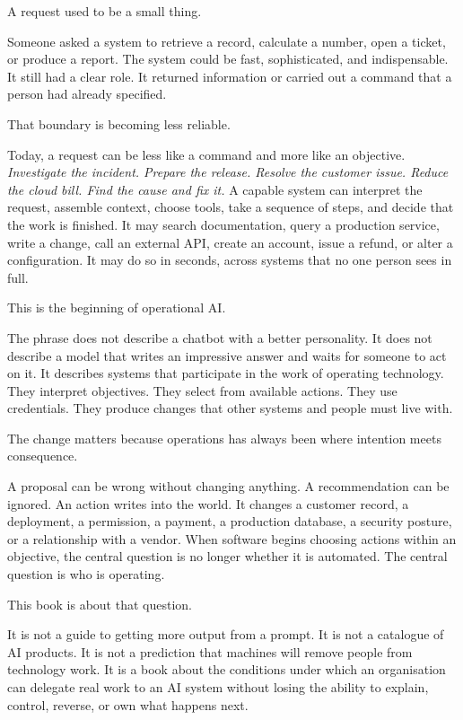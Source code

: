 A request used to be a small thing.

Someone asked a system to retrieve a record, calculate a number, open a
ticket, or produce a report. The system could be fast, sophisticated,
and indispensable. It still had a clear role. It returned information or
carried out a command that a person had already specified.

That boundary is becoming less reliable.

Today, a request can be less like a command and more like an objective.
\emph{Investigate the incident. Prepare the release. Resolve the
customer issue. Reduce the cloud bill. Find the cause and fix it.} A
capable system can interpret the request, assemble context, choose
tools, take a sequence of steps, and decide that the work is finished.
It may search documentation, query a production service, write a change,
call an external API, create an account, issue a refund, or alter a
configuration. It may do so in seconds, across systems that no one
person sees in full.

This is the beginning of operational AI.

The phrase does not describe a chatbot with a better personality. It
does not describe a model that writes an impressive answer and waits for
someone to act on it. It describes systems that participate in the work
of operating technology. They interpret objectives. They select from
available actions. They use credentials. They produce changes that other
systems and people must live with.

The change matters because operations has always been where intention
meets consequence.

A proposal can be wrong without changing anything. A recommendation can
be ignored. An action writes into the world. It changes a customer
record, a deployment, a permission, a payment, a production database, a
security posture, or a relationship with a vendor. When software begins
choosing actions within an objective, the central question is no longer
whether it is automated. The central question is who is operating.

This book is about that question.

It is not a guide to getting more output from a prompt. It is not a
catalogue of AI products. It is not a prediction that machines will
remove people from technology work. It is a book about the conditions
under which an organisation can delegate real work to an AI system
without losing the ability to explain, control, reverse, or own what
happens next.

